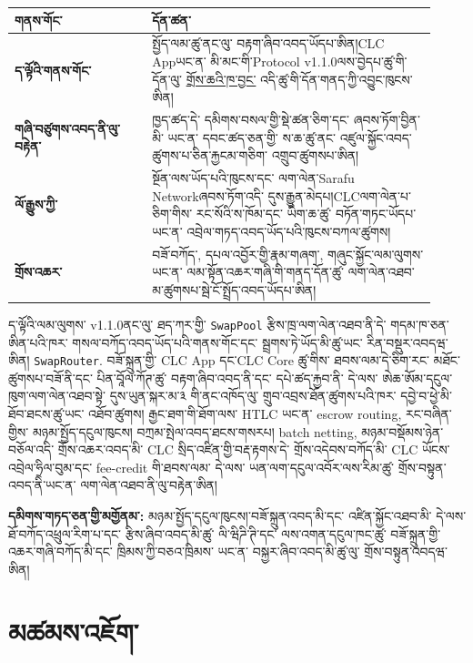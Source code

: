 \documentclass[11pt]{article}
\begin{document}
\begin{longtable}{P{0.30\linewidth} P{0.62\linewidth}}
\toprule
གནས་གོང་ & དོན་ཚན་ \\
\midrule
\endhead
\textbf{ད་ལྟོའི་གནས་གོང་} & སྤྱོད་ལམ་ཚུ་ནང་ལུ་ བརྟག་ཞིབ་འབད་ཡོདཔ་ཨིན།CLC Appཡང་ན་ མི་མང་གི་Protocol v1.1.0ལས་བྱེདཔ་ཚུ་གི་དོན་ལུ་ \href{https://docs.cosmolocal.credit/dz/protocol/overview}{གྲོས་ཆའི་ཁ་བྱང་} འདི་ཚུ་གི་དོན་གནད་ཀྱི་འབྱུང་ཁུངས་ཨིན། \\
\textbf{གཞི་བཙུགས་འབད་ནི་ལུ་བརྟེན་} & ཁྱད་ཚད་དེ་ དམིགས་བསལ་གྱི་སྡེ་ཚན་ཅིག་དང་ ཞབས་ཏོག་བྱིན་མི་ ཡང་ན་ དབང་ཚད་ཅན་གྱི་ ས་ཆ་ཚུ་ནང་ འཛུལ་སྐྱོང་འབད་ཚུགས་པ་ཅིན་རྐྱངམ་གཅིག་ འགྲུབ་ཚུགསཔ་ཨིན། \\
\textbf{ལོ་རྒྱུས་ཀྱི་} & སྔོན་ལས་ཡོད་པའི་ཁུངས་དང་ ལག་ལེན་Sarafu Networkཞབས་ཏོག་འདི་ དུས་རྒྱུན་མེདཔ།CLCལག་ལེན་པ་ཅིག་གིས་ རང་སོའི་ས་ཁོམ་དང་ ཡིག་ཆ་ཚུ་ བཏོན་གཏང་ཡོདཔ་ ཡང་ན་ འབྲེལ་གཏད་འབད་ཡོད་པའི་ཁུངས་བཀལ་ཚུགས། \\
\textbf{གྲོས་འཆར་} & བཟོ་བཀོད་, དཔལ་འབྱོར་གྱི་རྣམ་གཞག་, གཞུང་སྐྱོང་ལམ་ལུགས་ ཡང་ན་ ལམ་སྟོན་འཆར་གཞི་གི་གནད་དོན་ཚུ་ ལག་ལེན་འཐབ་མ་ཚུགསཔ་སྦེ་ངོ་སྤྲོད་འབད་ཡོདཔ་ཨིན། \\
\bottomrule
\end{longtable}

ད་ལྟོའི་ལམ་ལུགས་ v1.1.0ནང་ལུ་ ཐད་ཀར་གྱི་ \texttt{SwapPool} རྩིས་ཁྲ་ལག་ལེན་འཐབ་ནི་དེ་ གདམ་ཁ་ཅན་ཨིན་པའི་ཁར་ གསལ་བཀོད་འབད་ཡོད་པའི་གནས་གོང་དང་ སྦྲགས་ཏེ་ཡོད་མི་ཚུ་ཡང་ རིན་བསྡུར་འབདཝ་ཨིན། \texttt{SwapRouter}. བཟོ་སྐྲུན་གྱི་ CLC App དང་CLC Core ཚུ་གིས་ ཐབས་ལམ་དེ་ཅིག་རང་ མཐོང་ཚུགསཔ་བཟོ་ནི་དང་ པིན་བཱོལ་ཀོཊ་ཚུ་ བརྟག་ཞིབ་འབད་ནི་དང་ དཔེ་ཚད་རྐྱབ་ནི་ དེ་ལས་ ཨེཆ་ཨོམ་དངུལ་ཁུག་ལག་ལེན་འཐབ་སྟེ་ དུས་ཡུན་སྐར་མ་༣ གི་ནང་འཁོད་ལུ་ གྲུབ་འབྲས་ཐོན་ཚུགས་པའི་ཁར་ དབྱེ་བ་ཕྱེ་མི་ཐོབ་ཐངས་ཚུ་ཡང་ འཐོབ་ཚུགས། རྒྱང་ཐག་གི་ཐོག་ལས་ HTLC ཡང་ན་ escrow routing, རང་བཞིན་གྱིས་ མཉམ་སྤྱོད་དངུལ་ཁུངས། བཀྲམ་སྤེལ་འབད་ཐངས་གསརཔ། batch netting, མཉམ་བསྡོམས་ཉེན་བཅོལ་འདི་ གྲོས་འཆར་འབད་མི་ CLC སྲིད་འཛིན་གྱི་བརྡ་རྟགས་དེ་ གྲོས་འདེབས་བཀོད་མི་ CLC ཡོངས་འབྲེལ་ཧྲིལ་བུམ་དང་ fee-credit གི་ཐབས་ལམ་ དེ་ལས་ ཡན་ལག་དངུལ་འབོར་ལས་རིམ་ཚུ་ གྲོས་བསྟུན་འབད་ནི་ཡང་ན་ ལག་ལེན་འཐབ་ནི་ལུ་བརྟེན་ཨིན།

\textbf{དམིགས་གཏད་ཅན་གྱི་མགྱོནམ་:} མཉམ་སྤྱོད་དངུལ་ཁུངས།་བཟོ་སྐྲུན་འབད་མི་དང་ འཛིན་སྐྱོང་འཐབ་མི་ དེ་ལས་ ཐོ་བཀོད་འཕྲུལ་རིག་པ་དང་ རྩིས་ཞིབ་འབད་མི་ཚུ་ ལི་ཝིཌི་ཊི་དང་ ལས་འགན་དངུལ་ཁང་ཚུ་ བཟོ་སྐྲུན་གྱི་འཆར་གཞི་བཀོད་མི་དང་ ཁྲིམས་ཀྱི་བཅའ་ཁྲིམས་ ཡང་ན་ བསྐྱར་ཞིབ་འབད་མི་ཚུ་ལུ་ གྲོས་བསྟུན་འབདཝ་ཨིན།

\section*{མཚམས་འཇོག་}
\end{document}
